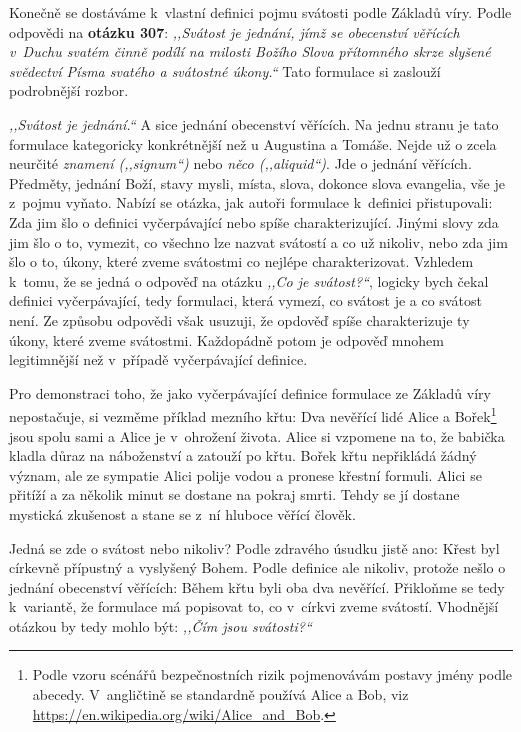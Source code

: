 Konečně se dostáváme k~vlastní definici pojmu svátosti podle Základů víry. Podle
odpovědi na \textbf{otázku 307}:
\textit{,,Svátost je jednání, jímž se obecenství věřících v~Duchu svatém činně
podílí na milosti Božího Slova přítomného skrze slyšené svědectví Písma svatého
a svátostné úkony.``} Tato formulace si zaslouží podrobnější rozbor.

\textit{,,Svátost je jednání.``} A sice jednání obecenství věřících. Na jednu
stranu je tato formulace kategoricky konkrétnější než u Augustina a Tomáše.
Nejde už o zcela neurčité \textit{znamení (,,signum``)} nebo \textit{něco
(,,aliquid``)}. Jde o jednání věřících. Předměty, jednání Boží, stavy mysli,
místa, slova, dokonce slova evangelia, vše je z~pojmu vyňato. Nabízí se otázka,
jak autoři formulace k~definici přistupovali: Zda jim šlo o definici
vyčerpávající nebo spíše charakterizující. Jinými slovy zda jim šlo o to, vymezit,
co všechno lze nazvat svátostí a co už nikoliv, nebo zda jim šlo o to, úkony,
které zveme svátostmi co nejlépe charakterizovat. Vzhledem k~tomu, že se jedná o
odpověď na otázku \textit{,,Co je svátost?{}``}, logicky bych čekal definici
vyčerpávající, tedy formulaci, která vymezí, co svátost je a co svátost není.
Ze způsobu odpovědi však usuzuji, že opdověď spíše charakterizuje ty úkony,
které zveme svátostmi. Každopádně potom je odpověď mnohem legitimnější než
v~případě vyčerpávající definice.

Pro demonstraci toho, že jako vyčerpávající definice formulace ze Základů víry
nepostačuje, si vezměme příklad mezního křtu: Dva nevěřící lidé Alice a
Bořek\footnote{Podle vzoru scénářů bezpečnostních rizik pojmenovávám postavy
jmény podle abecedy. V~angličtině se standardně používá Alice a Bob, viz
\url{https://en.wikipedia.org/wiki/Alice\_and\_Bob}.} jsou spolu sami a Alice je
v~ohrožení života. Alice si vzpomene na to, že babička kladla důraz na
náboženství a zatouží po křtu. Bořek křtu nepřikládá žádný význam, ale ze sympatie
Alici polije vodou a pronese křestní formuli. Alici se přitíží a za několik
minut se dostane na pokraj smrti. Tehdy se jí dostane mystická zkušenost a stane
se z~ní hluboce věřící člověk.

Jedná se zde o svátost nebo nikoliv? Podle zdravého úsudku jistě ano: Křest byl
církevně přípustný a vyslyšený Bohem. Podle definice ale nikoliv, protože nešlo
o jednání obecenství věřících: Během křtu byli oba dva nevěřící.
Přikloňme se tedy k~variantě, že formulace má popisovat to, co v~církvi zveme
svátostí. Vhodnější otázkou by tedy mohlo být: \textit{,,Čím jsou svátosti?{}``}

